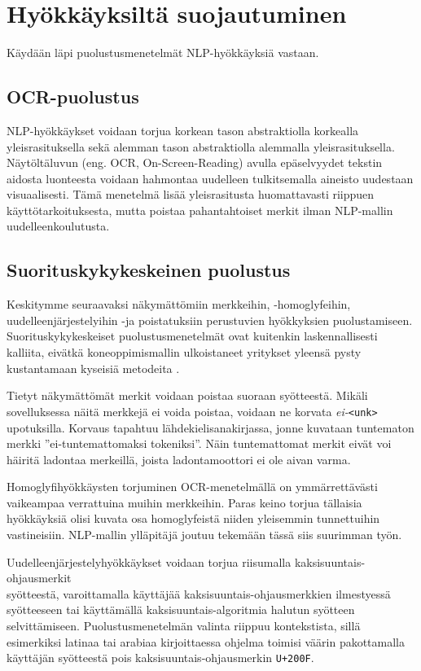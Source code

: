 \chapter{Hyökkäyksiltä suojautuminen\label{discussion}}

Käydään läpi puolustusmenetelmät NLP-hyökkäyksiä vastaan.

\section{OCR-puolustus}
NLP-hyökkäykset voidaan torjua korkean tason abstraktiolla korkealla yleisrasituksella sekä alemman tason abstraktiolla alemmalla yleisrasituksella. Näytöltäluvun (eng. OCR, On-Screen-Reading) avulla epäselvyydet tekstin aidosta luonteesta voidaan hahmontaa uudelleen tulkitsemalla aineisto uudestaan visuaalisesti. Tämä menetelmä lisää yleisrasitusta huomattavasti riippuen käyttötarkoituksesta, mutta poistaa pahantahtoiset merkit ilman NLP-mallin uudelleenkoulutusta. \citep{boucher2021bad}

\section{Suorituskykykeskeinen puolustus}
Keskitymme seuraavaksi näkymättömiin merkkeihin, -homoglyfeihin, \-uudelleenjärjestelyihin -ja poistatuksiin perustuvien hyökkyksien puolustamiseen. Suorituskykykeskeiset puolustusmenetelmät ovat kuitenkin laskennallisesti kalliita, eivätkä koneoppimismallin ulkoistaneet yritykset yleensä pysty kustantamaan kyseisiä metodeita \citep{https://doi.org/10.48550/arxiv.1911.07399}.

Tietyt näkymättömät merkit voidaan poistaa suoraan syötteestä. Mikäli sovelluksessa näitä merkkejä ei voida poistaa, voidaan ne korvata \textit{ei-}\texttt{<unk>} upotuksilla. Korvaus tapahtuu lähdekielisanakirjassa, jonne kuvataan tuntematon merkki ''ei-tuntemattomaksi tokeniksi''. Näin tuntemattomat merkit eivät voi häiritä ladontaa merkeillä, joista ladontamoottori ei ole aivan varma. \citep{boucher2021bad}

Homoglyfihyökkäysten torjuminen OCR-menetelmällä on ymmärrettävästi vaikeampaa verrattuina muihin merkkeihin. Paras keino torjua tällaisia hyökkäyksiä olisi kuvata osa homoglyfeistä niiden yleisemmin tunnettuihin vastineisiin. NLP-mallin ylläpitäjä joutuu tekemään tässä siis suurimman työn. \citep{boucher2021bad}

Uudelleenjärjestelyhyökkäykset voidaan torjua riisumalla kaksisuuntais-ohjausmerkit\\syötteestä, varoittamalla käyttäjää kaksisuuntais-ohjausmerkkien ilmestyessä syötteeseen tai käyttämällä kaksisuuntais-algoritmia halutun syötteen selvittämiseen. Puolustusmenetelmän valinta riippuu kontekstista, sillä esimerkiksi latinaa tai arabiaa kirjoittaessa ohjelma toimisi väärin pakottamalla käyttäjän syötteestä pois kaksisuuntais-ohjausmerkin \texttt{U+200F}. \citep{boucher2021bad}


